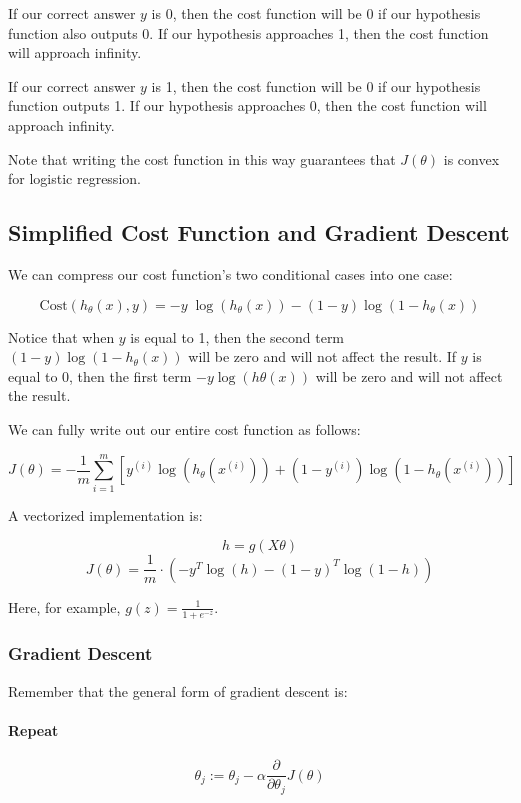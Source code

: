 \documentclass[UTF8]{article}
\begin{document}
If our correct answer $y$ is 0, then the cost function will be 0 if our hypothesis function also outputs 0. If our hypothesis approaches 1, then the cost function will approach infinity.

If our correct answer $y$ is 1, then the cost function will be 0 if our hypothesis function outputs 1. If our hypothesis approaches 0, then the cost function will approach infinity.

Note that writing the cost function in this way guarantees that $J(\theta)$ is convex for logistic regression.

\subsection{Simplified Cost Function and Gradient Descent}

We can compress our cost function's two conditional cases into one case:

\[ \mathrm{Cost}(h_\theta(x),y) = - y \; \log(h_\theta(x)) - (1 - y) \log(1 - h_\theta(x)) \]

Notice that when $y$ is equal to 1, then the second term $(1-y)\log(1-h_\theta(x))$ will be zero and will not affect the result. If $y$ is equal to 0, then the first term $-y\log(h\theta(x))$ will be zero and will not affect the result.

We can fully write out our entire cost function as follows:

\[J(\theta) = - \frac{1}{m} \displaystyle \sum_{i=1}^m [y^{(i)}\log (h_\theta (x^{(i)})) + (1 - y^{(i)})\log (1 - h_\theta(x^{(i)}))]\]

A vectorized implementation is:

\[ h = g(X\theta) \]
\[ J(\theta) = \frac{1}{m} \cdot \left(-y^{T}\log(h)-(1-y)^{T}\log(1-h)\right) \]

Here, for example, $g(z) = \frac{1}{1 + e^{-z}}$.

\subsubsection{Gradient Descent}

Remember that the general form of gradient descent is:

\paragraph{Repeat}
\[ \theta_j := \theta_j - \alpha \dfrac{\partial}{\partial \theta_j}J(\theta) \]
\end{document}
